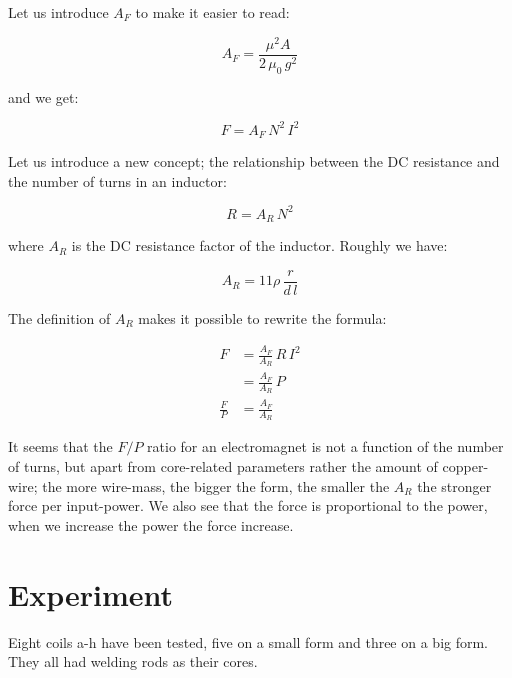 \documentclass[]{elementary-physics}
\begin{document}


Let us introduce $A_F$ to make it easier to read:

\begin{equation}
A_F = \frac{\mu^2 A}{2 \, \mu_0 \, g^2}
\end{equation}

and we get:

\begin{equation}
F = A_F \, N^2 \, I^2
\end{equation}

Let us introduce a new concept; the relationship between the DC resistance and the number of turns in an inductor:

\begin{equation}
R = A_R \, N^2
\end{equation}

where $A_R$ is the DC resistance factor of the inductor.
Roughly we have:

\begin{equation}
A_R = 11 \rho \, \frac{r}{d \, l}
\end{equation}

The definition of $A_R$ makes it possible to rewrite the formula:

\begin{subequations}
\begin{align}
F &= \frac{A_F}{A_R} \, R \, I^2 \\
&= \frac{A_F}{A_R} \, P \\
\frac{F}{P} &= \frac{A_F}{A_R}
\end{align}
\end{subequations}

It seems that the $F/P$ ratio for an electromagnet is not a function of the number of turns, but apart from core-related parameters rather the amount of copper-wire; the more wire-mass, the bigger the form, the smaller the $A_R$ the stronger force per input-power. We also see that the force is proportional to the power, when we increase the power the force increase.

\pagebreak

\section{Experiment}

Eight coils a-h have been tested, five on a small form and three on a big form.
They all had welding rods as their cores.
\end{document}

